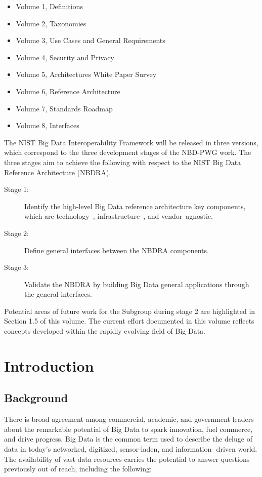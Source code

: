 \documentclass[11pt]{article}
\begin{document}
\begin{itemize}
\item	Volume 1, Definitions
\item	Volume 2, Taxonomies 
\item	Volume 3, Use Cases and General Requirements
\item	Volume 4, Security and Privacy 
\item	Volume 5, Architectures White Paper Survey
\item	Volume 6, Reference Architecture
\item	Volume 7, Standards Roadmap
\item       Volume 8, Interfaces
\end{itemize}


The NIST Big Data Interoperability Framework will be released in three versions, which correspond to 
the three development stages of the NBD-PWG work. The three stages aim to achieve the following with 
respect to the NIST Big Data Reference Architecture (NBDRA).

\begin{description}
\item[Stage 1:] Identify the high-level Big Data reference
  architecture key components, which are technology--, infrastructure--,
  and vendor--agnostic.
\item[Stage 2:] Define general interfaces between the NBDRA
  components.
\item[Stage 3:] Validate the NBDRA by building Big Data general
  applications through the general interfaces.
\end{description}

Potential areas of future work for the Subgroup during stage 2 are highlighted in Section 1.5 of this 
volume. The current effort documented in this volume reflects concepts developed within the rapidly 
evolving field of Big Data.



\section{Introduction}

\subsection{Background}

There is broad agreement among commercial, academic, and government leaders about the remarkable 
potential of Big Data to spark innovation, fuel commerce, and drive progress. Big Data is the common 
term used to describe the deluge of data in today’s networked, digitized, sensor-laden, and information-
driven world. The availability of vast data resources carries the potential to answer questions previously 
out of reach, including the following:
\end{document}
